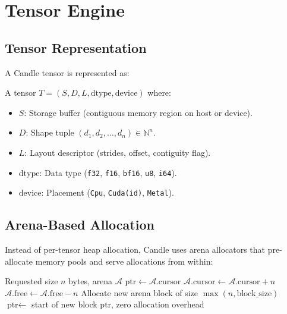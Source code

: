 \section{Tensor Engine}

\label{sec:tensor}

\subsection{Tensor Representation}

A Candle tensor is represented as:

\begin{definition}
A tensor $T = (S, D, L, \text{dtype}, \text{device})$ where:
\begin{itemize}[leftmargin=1.1em]
    \item $S$: Storage buffer (contiguous memory region on host or device).
    \item $D$: Shape tuple $(d_1, d_2, \ldots, d_n) \in \mathbb{N}^n$.
    \item $L$: Layout descriptor (strides, offset, contiguity flag).
    \item $\text{dtype}$: Data type (\texttt{f32}, \texttt{f16}, \texttt{bf16}, \texttt{u8}, \texttt{i64}).
    \item $\text{device}$: Placement (\texttt{Cpu}, \texttt{Cuda(id)}, \texttt{Metal}).
\end{itemize}
\end{definition}

\subsection{Arena-Based Allocation}

Instead of per-tensor heap allocation, Candle uses arena allocators that pre-allocate memory pools and serve allocations from within:

\begin{algorithm}[H]
\caption{Arena-Based Tensor Allocation}
\label{alg:arena}
\begin{algorithmic}[1]
\Require Requested size $n$ bytes, arena $\mathcal{A}$
    \State $\text{ptr} \gets \mathcal{A}.\text{cursor}$
    \State $\mathcal{A}.\text{cursor} \gets \mathcal{A}.\text{cursor} + n$
    \State $\mathcal{A}.\text{free} \gets \mathcal{A}.\text{free} - n$
\Else
    \State Allocate new arena block of size $\max(n, \text{block\_size})$
    \State $\text{ptr} \gets$ start of new block
\EndIf
\State \Return $\text{ptr}$, zero allocation overhead
\end{algorithmic}
\end{algorithm}

